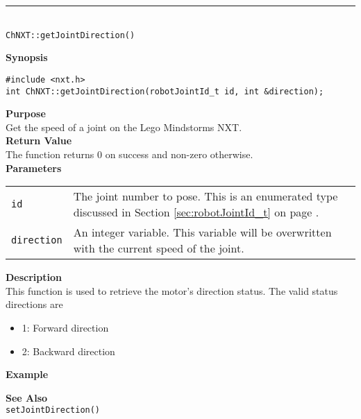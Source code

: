 \noindent
\vspace{5pt}
\rule{4.5in}{0.015in}\\
\noindent
{\LARGE \texttt{ChNXT::getJointDirection()}}\\
{}

\noindent
{\bf Synopsis}
\vspace{-8pt}
\begin{verbatim}
#include <nxt.h>
int ChNXT::getJointDirection(robotJointId_t id, int &direction);
\end{verbatim}

\noindent
{\bf Purpose}\\
Get the speed of a joint on the Lego Mindstorms NXT.\\

\noindent
{\bf Return Value}\\
The function returns 0 on success and non-zero otherwise.\\

\noindent
{\bf Parameters}
\vspace{-0.1in}
\begin{description}
\item               
\begin{tabular}{p{10 mm}p{145 mm}}
\texttt{id} & The joint number to pose. This is an enumerated type 
discussed in Section \ref{sec:robotJointId_t} on page
\pageref{sec:robotJointId_t}.\\
\texttt{direction} & An integer variable. This variable will be overwritten
with the current speed of the joint.
\end{tabular}
\end{description}

\noindent
{\bf Description}\\
This function is used to retrieve the motor's direction status. The valid
status directions are
\begin{itemize}
\item 1: Forward direction
\item 2: Backward direction
\end{itemize}

\noindent
{\bf Example}\\
\noindent

\noindent
{\bf See Also}\\
\texttt{setJointDirection()}


